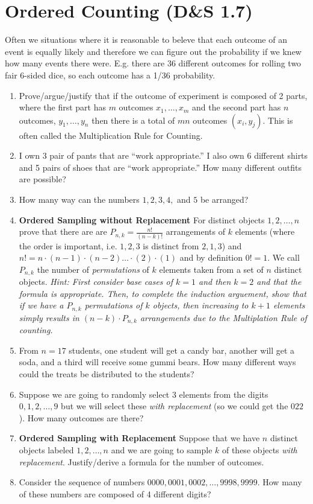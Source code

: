 \documentclass[]{book}
\begin{document}
\section{Ordered Counting (D\&S 1.7)}\label{ordered-counting-ds-1.7}

Often we situations where it is reasonable to beleve that each outcome
of an event is equally likely and therefore we can figure out the
probability if we knew how many events there were. E.g. there are 36
different outcomes for rolling two fair 6-sided dice, so each outcome
has a 1/36 probability.

\begin{enumerate}
\def\labelenumi{\arabic{enumi}.}
\item
  Prove/argue/justify that if the outcome of experiment is composed of 2
  parts, where the first part has \(m\) outcomes \(x_1, \dots, x_m\) and
  the second part has \(n\) outcomes, \(y_1,\dots,y_n\) then there is a
  total of \(mn\) outcomes \((x_i,y_j)\). This is often called the
  Multiplication Rule for Counting.
\item
  I own 3 pair of pants that are ``work appropriate.'' I also own 6
  different shirts and 5 pairs of shoes that are ``work appropriate.''
  How many different outfits are possible?
\item
  How many way can the numbers \(1,2,3,4,\) and \(5\) be arranged?
\item
  \textbf{Ordered Sampling without Replacement} For distinct objects
  \(1,2,\dots,n\) prove that there are are \(P_{n,k}=\frac{n!}{(n-k)!}\)
  arrangements of \(k\) elements (where the order is important, i.e.
  \(1,2,3\) is distinct from \(2,1,3\)) and
  \(n! = n\cdot(n-1)\cdot(n-2)\dots\cdot(2)\cdot(1)\) and by definition
  \(0!=1\). We call \(P_{n,k}\) the number of \emph{permutations} of
  \(k\) elements taken from a set of \(n\) distinct objects. \emph{Hint:
  First consider base cases of \(k=1\) and then \(k=2\) and that the
  formula is appropriate. Then, to complete the induction arguement,
  show that if we have a \(P_{n,k}\) permutations of \(k\) objects, then
  increasing to \(k+1\) elements simply results in
  \((n-k) \cdot P_{n,k}\) arrangements due to the Multiplation Rule of
  counting.}
\item
  From \(n=17\) students, one student will get a candy bar, another will
  get a soda, and a third will receive some gummi bears. How many
  different ways could the treats be distributed to the students?
\item
  Suppose we are going to randomly select \(3\) elements from the digits
  \(0,1,2,\dots,9\) but we will select these \emph{with replacement} (so
  we could get the \(022\)). How many outcomes are there?
\item
  \textbf{Ordered Sampling with Replacement} Suppose that we have \(n\)
  distinct objects labeled \(1,2,\dots,n\) and we are going to sample
  \(k\) of these objects \emph{with replacement}. Justify/derive a
  formula for the number of outcomes.
\item
  Consider the sequence of numbers
  \(0000, 0001, 0002, \dots, 9998, 9999\). How many of these numbers are
  composed of 4 different digits?
\end{enumerate}
\end{document}
